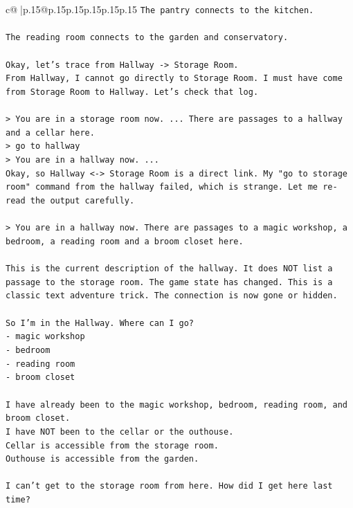 \documentclass{article}
\begin{document}
{\begin{supertabular}{c@{$\;$}|p{.15\linewidth}@{}p{.15\linewidth}p{.15\linewidth}p{.15\linewidth}p{.15\linewidth}p{.15\linewidth}}
{{{\texttt{The pantry connects to the kitchen.} \\
\\ 
\texttt{The reading room connects to the garden and conservatory.} \\
\\ 
\texttt{Okay, let's trace from Hallway {-}> Storage Room.} \\
\texttt{From Hallway, I cannot go directly to Storage Room. I must have come from Storage Room to Hallway. Let's check that log.} \\
\\ 
\texttt{> You are in a storage room now. ... There are passages to a hallway and a cellar here.} \\
\texttt{> go to hallway} \\
\texttt{> You are in a hallway now. ...} \\
\texttt{Okay, so Hallway <{-}> Storage Room is a direct link. My "go to storage room" command from the hallway failed, which is strange. Let me re{-}read the output carefully.} \\
\\ 
\texttt{> You are in a hallway now. There are passages to a magic workshop, a bedroom, a reading room and a broom closet here.} \\
\\ 
\texttt{This is the current description of the hallway. It does NOT list a passage to the storage room. The game state has changed. This is a classic text adventure trick. The connection is now gone or hidden.} \\
\\ 
\texttt{So I'm in the Hallway. Where can I go?} \\
\texttt{{-} magic workshop} \\
\texttt{{-} bedroom} \\
\texttt{{-} reading room} \\
\texttt{{-} broom closet} \\
\\ 
\texttt{I have already been to the magic workshop, bedroom, reading room, and broom closet.} \\
\texttt{I have NOT been to the cellar or the outhouse.} \\
\texttt{Cellar is accessible from the storage room.} \\
\texttt{Outhouse is accessible from the garden.} \\
\\ 
\texttt{I can't get to the storage room from here. How did I get here last time?} \\
}}}
\end{supertabular}}
\end{document}
